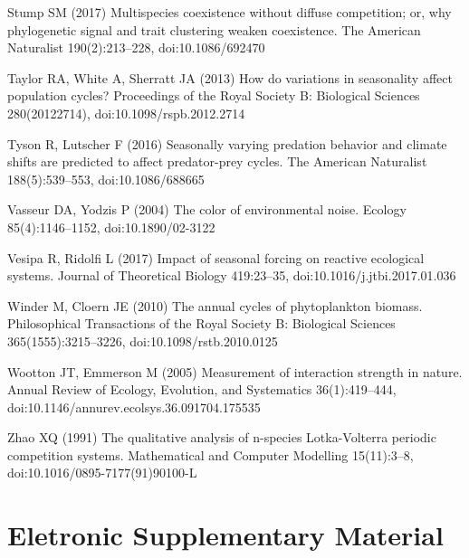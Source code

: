 \documentclass[a4paper,12pt]{article}
\begin{document}
\begin{thebibliography}{68}
Stump SM (2017) Multispecies coexistence without diffuse competition; or, why
  phylogenetic signal and trait clustering weaken coexistence. The American
  Naturalist 190(2):213--228, doi:{10.1086/692470}

Taylor RA, White A, Sherratt JA (2013) How do variations in seasonality affect
  population cycles? Proceedings of the Royal Society B: Biological Sciences
  280(20122714), doi:{10.1098/rspb.2012.2714}

Tyson R, Lutscher F (2016) Seasonally varying predation behavior and climate
  shifts are predicted to affect predator-prey cycles. The American Naturalist
  188(5):539--553, doi:{10.1086/688665}

Vasseur DA, Yodzis P (2004) {T}he color of environmental noise. Ecology
  85(4):1146--1152, doi:{10.1890/02-3122}

Vesipa R, Ridolfi L (2017) Impact of seasonal forcing on reactive ecological
  systems. Journal of Theoretical Biology 419:23--35,
  doi:{10.1016/j.jtbi.2017.01.036}

Winder M, Cloern JE (2010) The annual cycles of phytoplankton biomass.
  Philosophical Transactions of the Royal Society B: Biological Sciences
  365(1555):3215--3226, doi:{10.1098/rstb.2010.0125}

Wootton JT, Emmerson M (2005) Measurement of interaction strength in nature.
  Annual Review of Ecology, Evolution, and Systematics 36(1):419--444,
  doi:{10.1146/annurev.ecolsys.36.091704.175535}

Zhao XQ (1991) The qualitative analysis of n-species {L}otka-{V}olterra
  periodic competition systems. Mathematical and Computer Modelling
  15(11):3--8, doi:{10.1016/0895-7177(91)90100-L}

\end{thebibliography}
\newpage
\section*{Eletronic Supplementary Material}
\end{document}
